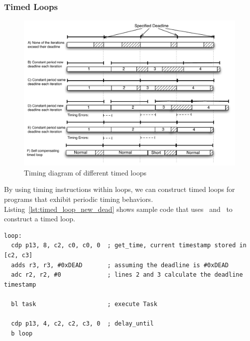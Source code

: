 \subsubsection{Timed Loops}
\label{sec:timed_loops}
\begin{figure}
  \vspace{-20pt}
  \begin{center}
    \includegraphics[scale=.7]{figs/timed_loop_differences.pdf}
  \end{center}
  \vspace{-20pt}
  \caption{Timing diagram of different timed loops}
  \label{fig:timed_loop_differences}
\end{figure}
By using timing instructions within loops, we can construct timed loops for programs that exhibit periodic timing behaviors.
Listing~\ref{lst:timed_loop_new_dead} shows sample code that uses \gettime\ and \delayuntil\ to construct a timed loop.

\begin{lstlisting}[float=h, label=lst:timed_loop_new_dead,caption=Timed loops with get\_time and delay\_until ]
loop:
  cdp p13, 8, c2, c0, c0, 0  ; get_time, current timestamp stored in [c2, c3]
  adds r3, r3, #0xDEAD       ; assuming the deadline is #0xDEAD
  adc r2, r2, #0             ; lines 2 and 3 calculate the deadline timestamp
   
  bl task                    ; execute Task
  
  cdp p13, 4, c2, c2, c3, 0  ; delay_until 
  b loop
\end{lstlisting}

